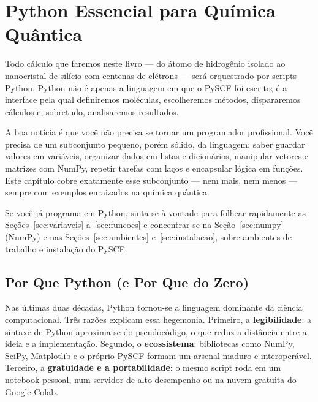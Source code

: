 \documentclass[11pt,a4paper,openany]{book}
\newcommand{\pyscf}{\textsf{PySCF}}
\newcommand{\numpy}{\textsf{NumPy}}
\newcommand{\python}{\textsf{Python}}
\begin{document}
\chapter{Python Essencial para Química Quântica}
\label{cap:python}

Todo cálculo que faremos neste livro --- do átomo de hidrogênio isolado ao
nanocristal de silício com centenas de elétrons --- será orquestrado por scripts
\python{}. \python{} não é apenas a linguagem em que o \pyscf{} foi escrito; é a
interface pela qual definiremos moléculas, escolheremos métodos, dispararemos
cálculos e, sobretudo, analisaremos resultados.

A boa notícia é que você não precisa se tornar um programador profissional. Você
precisa de um subconjunto pequeno, porém sólido, da linguagem: saber guardar
valores em variáveis, organizar dados em listas e dicionários, manipular vetores
e matrizes com \numpy{}, repetir tarefas com laços e encapsular lógica em
funções. Este capítulo cobre exatamente esse subconjunto --- nem mais, nem menos
--- sempre com exemplos enraizados na química quântica.

\begin{caixanota}
Se você já programa em \python{}, sinta-se à vontade para folhear rapidamente as
Seções~\ref{sec:variaveis} a~\ref{sec:funcoes} e concentrar-se na
Seção~\ref{sec:numpy} (\numpy{}) e nas Seções~\ref{sec:ambientes}
e~\ref{sec:instalacao}, sobre ambientes de trabalho e instalação do \pyscf{}.
\end{caixanota}

\section{Por Que Python (e Por Que do Zero)}

Nas últimas duas décadas, \python{} tornou-se a linguagem dominante da ciência
computacional. Três razões explicam essa hegemonia. Primeiro, a
\textbf{legibilidade}: a sintaxe de \python{} aproxima-se do pseudocódigo, o que
reduz a distância entre a ideia e a implementação. Segundo, o \textbf{ecossistema}:
bibliotecas como \numpy{}, SciPy, Matplotlib e o próprio \pyscf{} formam um arsenal
maduro e interoperável. Terceiro, a \textbf{gratuidade e a portabilidade}: o mesmo
script roda em um notebook pessoal, num servidor de alto desempenho ou na nuvem
gratuita do Google Colab.
\end{document}
